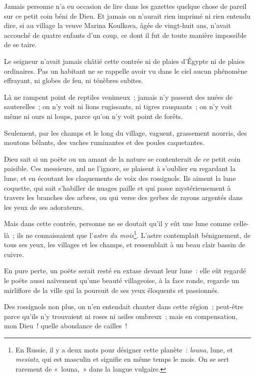 \documentclass[french,twoside]{book} %
\begin{document}
Jamais personne n’a eu occasion de lire dans les gazettes quelque chose de pareil sur ce petit coin béni de Dieu. Et jamais on n’aurait rien imprimé ni rien entendu dire, si au village la veuve Marina Koulkova, âgée de vingt-huit ans, n’avait accouché de quatre enfants d’un coup, ce dont il fut de toute manière impossible de se taire.\par
Le seigneur n’avait jamais châtié cette contrée ni de plaies d’Égypte ni de plaies ordinaires. Pas un habitant ne se rappelle avoir vu dans le ciel aucun phénomène effrayant, ni globes de feu, ni ténèbres subites.\par
Là ne rampent point de reptiles venimeux ; jamais n’y passent des nuées de sauterelles ; on n’y voit ni lions rugissants, ni tigres rauquants ; on n’y voit même ni ours ni loups, parce qu’on n’y voit point de forêts.\par
Seulement, par les champs et le long du village, vaguent, grassement nourris, des moutons bêlants, des vaches ruminantes et des poules caquetantes.\par
Dieu sait si un poëte ou un amant de la nature se contenterait de ce petit coin paisible. Ces messieurs, nul ne l’ignore, se plaisent à s’oublier en regardant la lune, et en écoutant les claquements de voix des rossignols. Ils aiment la lune coquette, qui sait s’habiller de nuages paille et qui passe mystérieusement à travers les branches des arbres, ou qui verse des gerbes de rayons argentés dans les yeux de ses adorateurs.\par
Mais dans cette contrée, personne ne se doutait qu’il y eût une lune comme celle-là ; ils ne connaissaient que l’\emph{astre du mois}\footnote{En Russie, il y a deux mots pour désigner cette planète : \emph{louna}, lune, et \emph{mesiatz}, qui est masculin et signifie en même temps le mois. On se sert rarement de « louna, » dans la langue vulgaire.}. L’astre contemplait bénignement, de tous ses yeux, les villages et les champs, et ressemblait à un beau clair bassin de cuivre.\par
En pure perte, un poëte serait resté en extase devant leur lune : elle eût regardé le poëte aussi naïvement qu’une beauté villageoise, à la face ronde, regarde un mirliflore de la ville qui la poursuit de ses yeux éloquents et passionnés.\par
Des rossignols non plus, on n’en entendait chanter dans cette région ; peut-être parce qu’ils n’y trouvaient ni roses ni asiles ombreux ; mais en compensation, mon Dieu ! quelle abondance de cailles !\par
\end{document}
